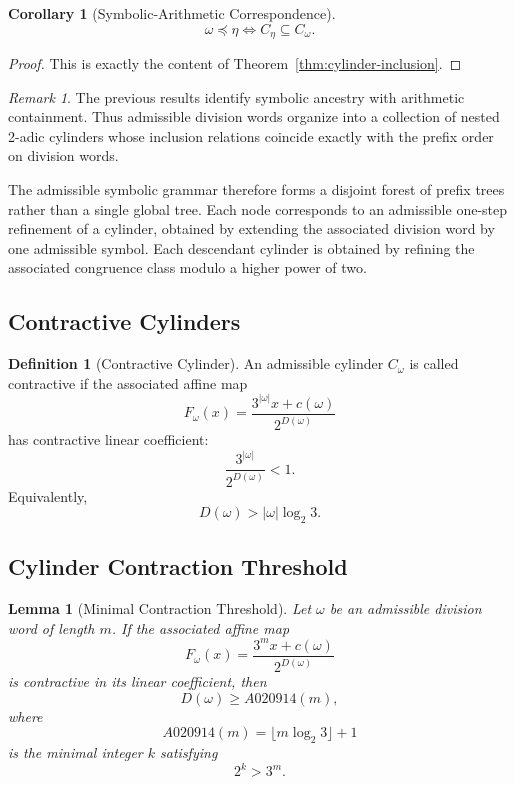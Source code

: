\documentclass[12pt, oneside]{article}
\numberwithin{equation}{section}
\theoremstyle{definition}
\newtheorem{definition}{Definition}[section]
\theoremstyle{plain}
\newtheorem{lemma}[theorem]{Lemma}
\newtheorem{corollary}[theorem]{Corollary}
\theoremstyle{remark}
\newtheorem*{remark}{Remark}
\begin{document}
\begin{corollary}[Symbolic-Arithmetic Correspondence]
\[
\omega\preceq\eta
\iff
C_\eta\subseteq C_\omega.
\]
\end{corollary}

\begin{proof}
This is exactly the content of
Theorem~\ref{thm:cylinder-inclusion}.
\end{proof}

\begin{remark}
The previous results identify symbolic ancestry with arithmetic
containment.  Thus admissible division words organize into a collection
of nested 2-adic cylinders whose inclusion relations coincide exactly
with the prefix order on division words.

The admissible symbolic grammar therefore forms a disjoint forest of
prefix trees rather than a single global tree. Each node corresponds
to an admissible one-step refinement of a cylinder, obtained by
extending the associated division word by one admissible symbol.  Each
descendant cylinder is obtained by refining the associated congruence
class modulo a higher power of two.
\end{remark}

\subsection{Contractive Cylinders}

\begin{definition}[Contractive Cylinder]
An admissible cylinder \(C_\omega\) is called contractive if the
associated affine map
\[
F_\omega(x) = \frac{3^{|\omega|}x+c(\omega)}{2^{D(\omega)}}
\]
has contractive linear coefficient:
\[
\frac{3^{|\omega|}}{2^{D(\omega)}}<1.
\]
Equivalently,
\[
D(\omega)>|\omega|\log_2 3.
\]
\end{definition}

\subsection{Cylinder Contraction Threshold}

\begin{lemma}[Minimal Contraction Threshold]
\label{lem:minimal-contraction-threshold}
Let $\omega$ be an admissible division word of length $m$. If the
associated affine map
\[
F_\omega(x) = \frac{3^m x+c(\omega)}{2^{D(\omega)}}
\]
is contractive in its linear coefficient, then
\[
D(\omega)\ge A020914(m),
\]
where
\[
A020914(m)=\lfloor m\log_2 3\rfloor + 1
\]
is the minimal integer \(k\) satisfying
\[
2^k>3^m.
\]
\end{lemma}
\end{document}
